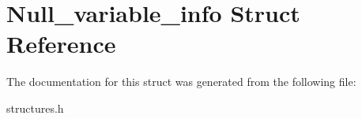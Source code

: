 \hypertarget{structNull__variable__info}{}\section{Null\+\_\+variable\+\_\+info Struct Reference}
\label{structNull__variable__info}


The documentation for this struct was generated from the following file\+:\begin{DoxyCompactItemize}
\item 
structures.\+h\end{DoxyCompactItemize}
